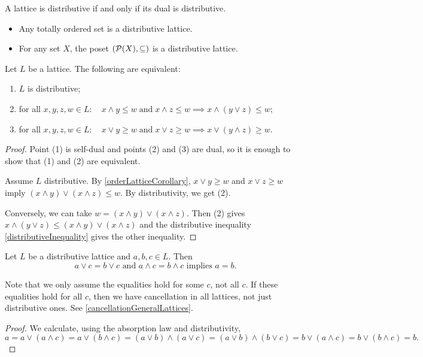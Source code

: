 \begin{lemma}
A lattice is distributive \textup{if and only if} its dual is distributive.
\end{lemma}

\begin{example}
\begin{itemize}
\item Any totally ordered set is a distributive lattice.
\item For any set $X$, the poset $\sSet{\powerset(X), \subseteq}$ is a distributive lattice.
\end{itemize}
\end{example}

\begin{lemma}
Let $L$ be a lattice. The following are equivalent:
\begin{enumerate}
\item $L$ is distributive;
\item for all $x,y,z,w\in L: \quad x\wedge y \leq w \;\text{and}\; x\wedge z\leq w \implies x\wedge (y\vee z) \leq w;$
\item for all $x,y,z,w\in L: \quad x\vee y \geq w \;\text{and}\; x\vee z\geq w \implies x\vee (y\wedge z) \geq w$.
\end{enumerate}
\end{lemma}
\begin{proof}
Point (1) is self-dual and points (2) and (3) are dual, so it is enough to show that (1) and (2) are equivalent.

Assume $L$ distributive. By \ref{orderLatticeCorollary}, $ x\vee y \geq w$ and $x\vee z\geq w$ imply $(x\wedge y)\vee (x\wedge z) \leq w$. By distributivity, we get (2).

Conversely, we can take $w = (x\wedge y)\vee (x\wedge z)$. Then (2) gives $x\wedge (y\vee z) \leq (x\wedge y)\vee (x\wedge z)$ and the distributive inequality \ref{distributiveInequality} gives the other inequality. 
\end{proof}

\begin{proposition} \label{cancellationDistributiveLattices}
Let $L$ be a distributive lattice and $a,b,c\in L$. Then
\[ \text{$a\vee c = b \vee c$ and $a\wedge c = b \wedge c$ implies $a = b$.} \]
\end{proposition}
Note that we only assume the equalities hold for some $c$, not all $c$. If these equalities hold for all $c$, then we have cancellation in all lattices, not just distributive ones. See \ref{cancellationGeneralLattices}.
\begin{proof}
We calculate, using the absorption law and distributivity,
\[ a = a\vee (a\wedge c) = a \vee (b\wedge c) = (a\vee b)\wedge (a\vee c) = (a\vee b) \wedge (b\vee c) = b \vee (a \wedge c) = b \vee (b\wedge c) = b. \]
\end{proof}

